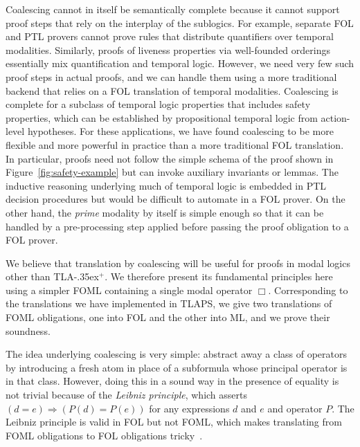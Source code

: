 \documentclass{easychair}
\newcommand{\tlaplus}{\mbox{TLA\kern -.35ex$^+$}\xspace}
\newcommand{\edmargin}[2]{\marginpar{\raggedright\footnotesize\color{red}#1: #2}}
\newcommand{\edmargin}[2]{}
\def\llmargin{\edmargin{LL}}
\def\ddmargin{\edmargin{DD}}
\begin{document}
Coalescing cannot in itself be semantically complete because it cannot support
proof steps that rely on the interplay of the sublogics. For example,
separate FOL and PTL provers
cannot
prove rules that distribute quantifiers over temporal modalities. Similarly,
proofs of liveness properties via well-founded orderings essentially mix
quantification and temporal logic. However, we need very few such proof steps
in actual
proofs, and we can handle them using a more traditional
backend that relies on a FOL translation of temporal modalities. Coalescing is
complete for a subclass of temporal logic properties that includes safety
properties, which can be established by propositional temporal logic from
action-level hypotheses. For these applications, we have found coalescing to
be more flexible and more powerful in practice than a more traditional FOL
translation. In particular, proofs need not follow the simple schema of the
proof shown in Figure~\ref{fig:safety-example} but can invoke auxiliary
invariants or lemmas. The inductive reasoning underlying much of temporal logic
is embedded in PTL decision procedures but would be difficult to automate in a
FOL prover. On the other hand, the \emph{prime} modality by itself is simple
enough so that it can be handled by a pre-processing step applied before passing
the proof obligation to a FOL prover.


We believe that translation by coalescing will be useful for proofs in
modal logics other than \tlaplus. We therefore present its fundamental
principles here using a simpler FOML containing a single modal operator $\Box$.
Corresponding to the translations we have implemented in TLAPS, we give two
translations of FOML obligations, one into FOL and the other into ML, and we
prove their soundness.

The idea underlying coalescing is very simple: abstract away a class
of operators by introducing a fresh atom in place of a subformula
whose principal operator is in that class.
However, doing this in a sound way in the presence of equality is not
trivial because of the \emph{Leibniz principle}, which asserts
 $(d=e) \Rightarrow (P(d) = P(e))$
for any expressions $d$ and $e$ and operator $P$.  The Leibniz
principle is valid in FOL but not FOML, which makes translating from
FOML obligations to FOL obligations tricky~\cite{mendelsohn:foml}.
\end{document}
